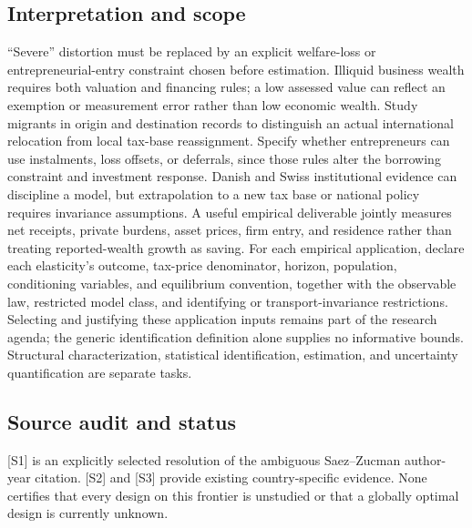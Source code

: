\documentclass[11pt,a4paper]{article}
\begin{document}
\subsection*{Interpretation and scope}
“Severe” distortion must be replaced by an explicit welfare-loss or entrepreneurial-entry constraint chosen before estimation. Illiquid business wealth requires both valuation and financing rules; a low assessed value can reflect an exemption or measurement error rather than low economic wealth. Study migrants in origin and destination records to distinguish an actual international relocation from local tax-base reassignment. Specify whether entrepreneurs can use instalments, loss offsets, or deferrals, since those rules alter the borrowing constraint and investment response. Danish and Swiss institutional evidence can discipline a model, but extrapolation to a new tax base or national policy requires invariance assumptions. A useful empirical deliverable jointly measures net receipts, private burdens, asset prices, firm entry, and residence rather than treating reported-wealth growth as saving. For each empirical application, declare each elasticity's outcome, tax-price denominator, horizon, population, conditioning variables, and equilibrium convention, together with the observable law, restricted model class, and identifying or transport-invariance restrictions. Selecting and justifying these application inputs remains part of the research agenda; the generic identification definition alone supplies no informative bounds. Structural characterization, statistical identification, estimation, and uncertainty quantification are separate tasks.

\subsection*{Source audit and status}
[S1] is an explicitly selected resolution of the ambiguous Saez--Zucman author-year citation. [S2] and [S3] provide existing country-specific evidence. None certifies that every design on this frontier is unstudied or that a globally optimal design is currently unknown.
\end{document}
